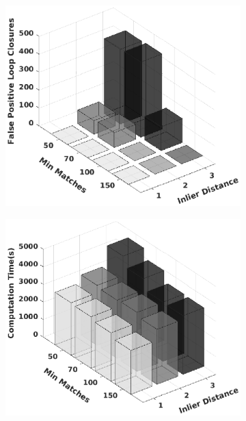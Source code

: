 \begin{figure}
	\begin{subfigure}[b]{.3\textwidth}
		\includegraphics[width=\textwidth]{Figure6_a.eps}
	\end{subfigure}
	\begin{subfigure}[b]{0.3\textwidth}
		\includegraphics[width=\textwidth]{Figure6_b.eps}

\end{subfigure}
\end{figure}
